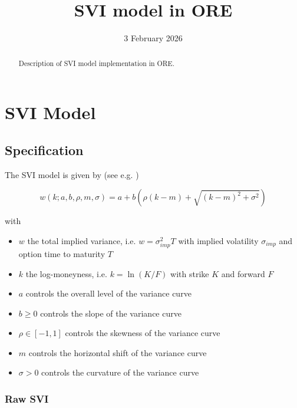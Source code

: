 \documentclass{amsart}
\theoremstyle{plain}
\numberwithin{equation}{section}
\begin{document}
\title{SVI model in ORE}

\date{3 February 2026}

\begin{abstract}
Description of SVI model implementation in ORE.
\end{abstract}
\maketitle


\section{SVI Model}\label{sec:model}

\subsection{Specification}

The SVI model is given by (see e.g. \cite{Gatheral_2004})

\begin{equation}
w(k; a,b,\rho,m,\sigma) = a + b \left( \rho (k - m) + \sqrt{(k - m)^2 + \sigma^2} \right)
\end{equation}

with

\begin{itemize}
\item $w$ the total implied variance, i.e. $w = \sigma_{imp}^2 T$ with implied volatility $\sigma_{imp}$ and
  option time to maturity $T$
\item $k$ the log-moneyness, i.e. $k = \ln(K/F)$ with strike $K$ and forward $F$
\item $a$ controls the overall level of the variance curve
\item $b \ge 0$ controls the slope of the variance curve
\item $\rho \in [-1,1]$ controls the skewness of the variance curve
\item $m$ controls the horizontal shift of the variance curve
\item $\sigma > 0$ controls the curvature of the variance curve
\end{itemize}

\subsubsection{Raw SVI}\label{sec:rawsvi}
\end{document}
